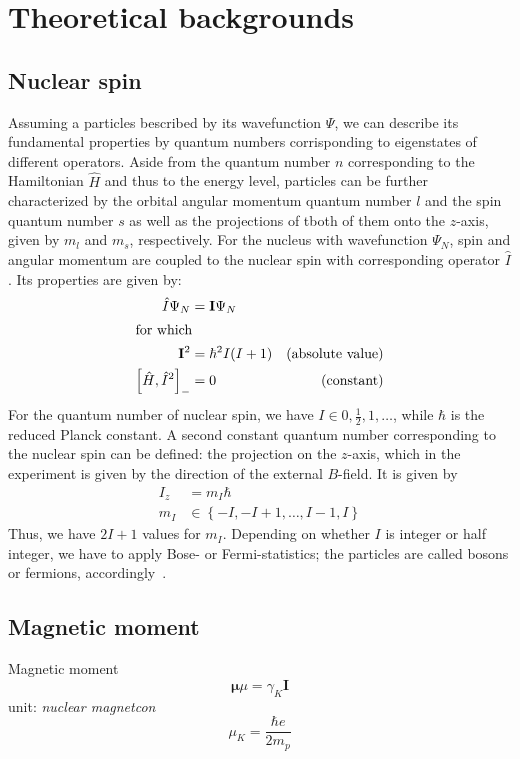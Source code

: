 \section{Theoretical backgrounds}
\subsection{Nuclear spin}
Assuming a particles bescribed by its wavefunction $\Psi$, we can describe 
its fundamental properties by quantum numbers corrisponding to eigenstates
of different operators. Aside from the quantum number $n$ corresponding to the 
Hamiltonian $\hat{H}$ and thus to the energy level, particles can be further characterized 
by the orbital angular momentum quantum number $l$ and the spin quantum number 
$s$ as well as the projections of tboth of them onto the $z$-axis, given by 
$m_l$ and $m_s$, respectively. For the nucleus with wavefunction $\Psi_N$, 
spin and angular momentum are coupled to the 
nuclear spin with corresponding operator $\hat{I}$. Its properties are given by:
\begin{align}
    \hat{I} \Psi_N &= \mathbf{I} \Psi_N \\ 
\intertext{for which}
    \mathbf{I}^2 &= \hbar^2 I(I + 1)  &\text{(absolute value)} \\
    \left[\hat{H}, \hat{I}^2\right]_- &= 0  &\text{(constant)}
\end{align}
For the quantum number of nuclear spin, we have $I \in {0, \frac{1}{2}, 1, \ldots}$, while $\hbar$ is the 
reduced Planck constant. A second constant quantum number corresponding to the nuclear spin can be defined:
the projection on the $z$-axis, which in the experiment is given by the direction of the external $B$-field.
It is given by
\begin{align}
    I_z &= m_I \hbar \\
    m_I &\in \left\{-I, -I + 1, \ldots, I - 1, I\right\}
\end{align}
Thus, we have $2I + 1$ values for $m_I$. Depending on whether $I$ is integer or half integer, 
we have to apply Bose- or Fermi-statistics; the particles are called bosons or fermions, 
accordingly~\cite{Demtroeder1}.

\subsection{Magnetic moment}
Magnetic moment
\begin{equation}
    \mathbf{\mu} \mu = \gamma_K \mathbf{I}
\end{equation}
unit: \emph{nuclear magnetcon}
\begin{equation}
    \mu_K = \frac{\hbar e}{2 m_p}
\end{equation}


